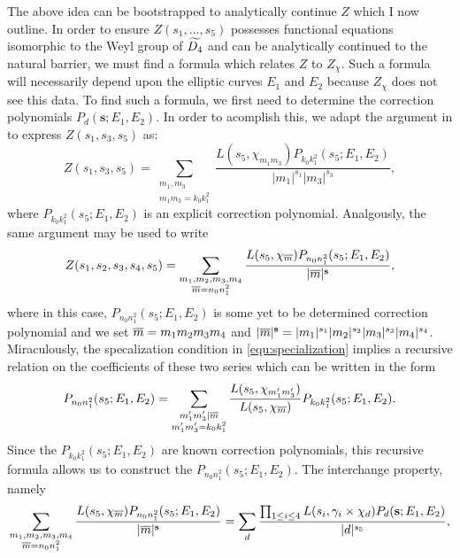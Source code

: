 \documentclass[12pt,reqno,oneside]{amsart}
\begin{document}
The above idea can be bootstrapped to analytically continue $Z$ which I now outline. In order to ensure $Z(s_{1},\ldots,s_{5})$ possesses functional equations isomorphic to the Weyl group of $\widetilde{D_{4}}$ and can be analytically continued to the natural barrier, we must find a formula which relates $Z$ to $Z_{\chi}$. Such a formula will necessarily depend upon the elliptic curves $E_{1}$ and $E_{2}$ because $Z_{\chi}$ does not see this data. To find such a formula, we first need to determine the correction polynomials $P_{d}(\mathbf{s};E_{1},E_{2})$. In order to acomplish this, we adapt the argument in  to express $Z(s_{1},s_{3},s_{5})$ as:
\[
  Z(s_{1},s_{3},s_{5}) = \sum_{\substack{m_{1},m_{3} \\ m_{1}m_{3} = k_{0}k_{1}^{2}}}\frac{L(s_{5},\chi_{m_{1}m_{3}})P_{k_{0}k_{1}^{2}}(s_{5};E_{1},E_{2})}{|m_{1}|^{s_{1}}|m_{3}|^{s_{3}}},
\]
where $P_{k_{0}k_{1}^{2}}(s_{5};E_{1},E_{2})$ is an explicit correction polynomial. Analgously, the same argument may be used to write
\[
  Z(s_{1},s_{2},s_{3},s_{4},s_{5}) = \sum_{\substack{m_{1},m_{2},m_{3},m_{4} \\ \overline{m} = n_{0}n_{1}^{2}}}\frac{L(s_{5},\chi_{\overline{m}})P_{n_{0}n_{1}^{2}}(s_{5};E_{1},E_{2})}{|\overline{m}|^{\mathbf{s}}},
\]
where in this case, $P_{n_{0}n_{1}^{2}}(s_{5};E_{1},E_{2})$ is some yet to be determined correction polynomial and we set $\overline{m} = m_{1}m_{2}m_{3}m_{4}$ and $|\overline{m}|^{\mathbf{s}} = |m_{1}|^{s_{1}}|m_{2}|^{s_{2}}|m_{3}|^{s_{3}}|m_{4}|^{s_{4}}$. Miraculously, the specalization condition in \cref{equ:specialization} implies a recursive relation on the coefficients of these two series which can be written in the form
\begin{equation}\label{equ:divisor_condition}
  P_{n_{0}n_{1}^{2}}(s_{5};E_{1},E_{2}) = \sum_{\substack{m_{1}'m_{3}' \mid \overline{m} \\ m_{1}'m_{3}' = k_{0}k_{1}^{2}}}\frac{L(s_{5},\chi_{m_{1}'m_{3}'})}{L(s_{5},\chi_{\overline{m}})}P_{k_{0}k_{1}^{2}}(s_{5};E_{1},E_{2}).
\end{equation}
Since the $P_{k_{0}k_{1}^{2}}(s_{5};E_{1},E_{2})$ are known correction polynomials, this recursive formula allows us to construct the $P_{n_{0}n_{1}^{2}}(s_{5};E_{1},E_{2})$. The interchange property, namely
\[
  \sum_{\substack{m_{1},m_{2},m_{3},m_{4} \\ \overline{m} = n_{0}n_{1}^{2}}}\frac{L(s_{5},\chi_{\overline{m}})P_{n_{0}n_{1}^{2}}(s_{5};E_{1},E_{2})}{|\overline{m}|^{\mathbf{s}}} = \sum_{d}\frac{\prod_{1 \le i \le 4}L(s_{i},\gamma_{i} \times \chi_{d})P_{d}(\mathbf{s};E_{1},E_{2})}{|d|^{s_{5}}},
\]
\end{document}
